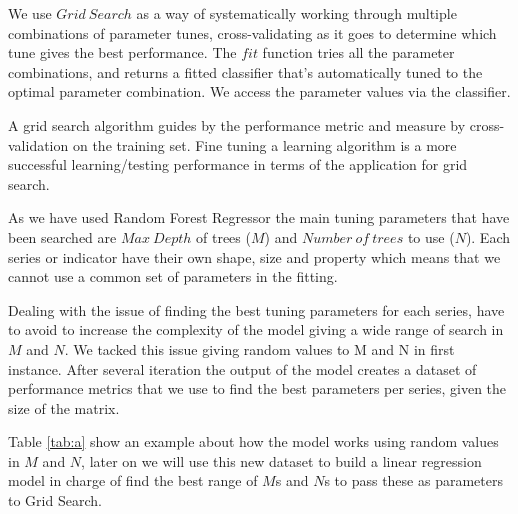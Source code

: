 \documentclass[a4project, twocolumn]{article}
\begin{document}
We use $Grid\ Search$ as a way of systematically working through multiple combinations of parameter tunes, cross-validating as it goes to determine which tune gives the best performance. The $fit$ function tries all the parameter combinations, and returns a fitted classifier that's automatically tuned to the optimal parameter combination. We access the parameter values via the classifier.

A grid search algorithm guides by the performance metric and measure by cross-validation on the training set. Fine tuning a learning algorithm is a more successful learning/testing performance in terms of the application for grid search.

As we have used Random Forest Regressor the main tuning parameters that have been searched are $Max\ Depth$ of trees ($M$) and $Number\ of\ trees$ to use ($N$). Each series or indicator have their own shape, size and property which means that we cannot use a common set of parameters in the fitting.

Dealing with the issue of finding the best tuning parameters for each series, have to avoid to increase the complexity of the model giving a wide range of search in $M$ and $N$. We tacked this issue giving random values to M and N in first instance. After several iteration the output of the model creates a dataset of performance metrics that we use to find the best parameters per series, given the size of the matrix.

Table \ref{tab:a} show an example about how the model works using random values in $M$ and $N$, later on we will use this new dataset to build a linear regression model in charge of find the best range of $M$s and $N$s to pass these as parameters to Grid Search.
\end{document}
